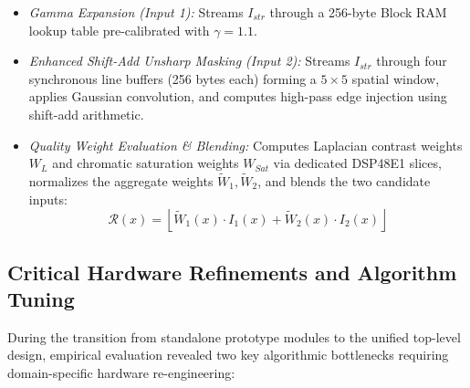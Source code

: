 \documentclass[10pt,twocolumn,letterpaper]{article}
\begin{document}
{\begin{enumerate}
\begin{itemize}
        \begin{equation}
          I_{str,c}(x) = \left\lfloor \frac{255 \cdot (I_{wb,c}(x) - min_c)}{max_c - min_c} \right\rfloor
          \label{eq:hw_stretch}
        \end{equation}
        \item \emph{Gamma Expansion (Input 1):} Streams $I_{str}$ through a 256-byte Block RAM lookup table pre-calibrated with $\gamma = 1.1$.
        \item \emph{Enhanced Shift-Add Unsharp Masking (Input 2):} Streams $I_{str}$ through four synchronous line buffers (256 bytes each) forming a $5\times5$ spatial window, applies Gaussian convolution, and computes high-pass edge injection using shift-add arithmetic.
        \item \emph{Quality Weight Evaluation \& Blending:} Computes Laplacian contrast weights $W_L$ and chromatic saturation weights $W_{Sat}$ via dedicated DSP48E1 slices, normalizes the aggregate weights $\tilde{W}_1, \tilde{W}_2$, and blends the two candidate inputs:
        \begin{equation}
          \mathcal{R}(x) = \left\lfloor \tilde{W}_1(x) \cdot I_1(x) + \tilde{W}_2(x) \cdot I_2(x) \right\rfloor
          \label{eq:hw_blended_fusion}
        \end{equation}
    \end{itemize}
\end{enumerate}

\subsection{Critical Hardware Refinements and Algorithm Tuning}
\label{subsec:hardware_refinements}

During the transition from standalone prototype modules to the unified top-level design, empirical evaluation revealed two key algorithmic bottlenecks requiring domain-specific hardware re-engineering:

}
\end{document}
